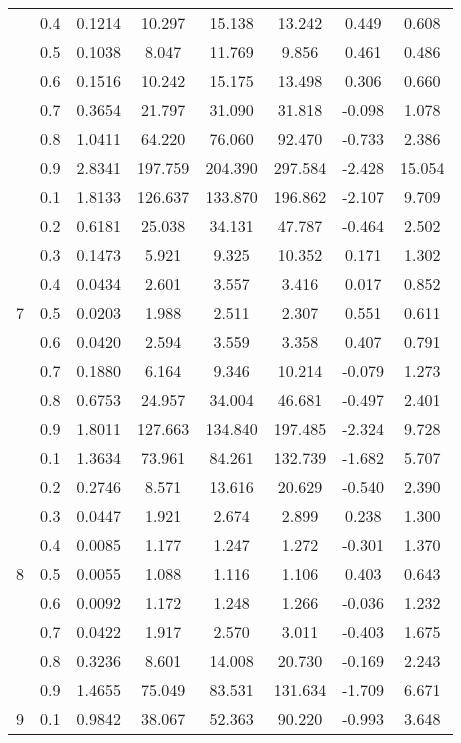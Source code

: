 \documentclass[11pt,a4paper]{report}
\begin{document}
\begin{longtable}{ | c | c || c | c | c | c | c | c | }
 & 0.4 & 0.1214 & 10.297 & 15.138 & 13.242 & 0.449 & 0.608 \\
 & 0.5 & 0.1038 & 8.047 & 11.769 & 9.856 & 0.461 & 0.486 \\
 & 0.6 & 0.1516 & 10.242 & 15.175 & 13.498 & 0.306 & 0.660 \\
 & 0.7 & 0.3654 & 21.797 & 31.090 & 31.818 & -0.098 & 1.078 \\
 & 0.8 & 1.0411 & 64.220 & 76.060 & 92.470 & -0.733 & 2.386 \\
 & 0.9 & 2.8341 & 197.759 & 204.390 & 297.584 & -2.428 & 15.054 \\
 \hline
\multirow{9}{*}{7} & 0.1 & 1.8133 & 126.637 & 133.870 & 196.862 & -2.107 & 9.709 \\
 & 0.2 & 0.6181 & 25.038 & 34.131 & 47.787 & -0.464 & 2.502 \\
 & 0.3 & 0.1473 & 5.921 & 9.325 & 10.352 & 0.171 & 1.302 \\
 & 0.4 & 0.0434 & 2.601 & 3.557 & 3.416 & 0.017 & 0.852 \\
 & 0.5 & 0.0203 & 1.988 & 2.511 & 2.307 & 0.551 & 0.611 \\
 & 0.6 & 0.0420 & 2.594 & 3.559 & 3.358 & 0.407 & 0.791 \\
 & 0.7 & 0.1880 & 6.164 & 9.346 & 10.214 & -0.079 & 1.273 \\
 & 0.8 & 0.6753 & 24.957 & 34.004 & 46.681 & -0.497 & 2.401 \\
 & 0.9 & 1.8011 & 127.663 & 134.840 & 197.485 & -2.324 & 9.728 \\
 \hline
\multirow{9}{*}{8} & 0.1 & 1.3634 & 73.961 & 84.261 & 132.739 & -1.682 & 5.707 \\
 & 0.2 & 0.2746 & 8.571 & 13.616 & 20.629 & -0.540 & 2.390 \\
 & 0.3 & 0.0447 & 1.921 & 2.674 & 2.899 & 0.238 & 1.300 \\
 & 0.4 & 0.0085 & 1.177 & 1.247 & 1.272 & -0.301 & 1.370 \\
 & 0.5 & 0.0055 & 1.088 & 1.116 & 1.106 & 0.403 & 0.643 \\
 & 0.6 & 0.0092 & 1.172 & 1.248 & 1.266 & -0.036 & 1.232 \\
 & 0.7 & 0.0422 & 1.917 & 2.570 & 3.011 & -0.403 & 1.675 \\
 & 0.8 & 0.3236 & 8.601 & 14.008 & 20.730 & -0.169 & 2.243 \\
 & 0.9 & 1.4655 & 75.049 & 83.531 & 131.634 & -1.709 & 6.671 \\
 \hline
\multirow{9}{*}{9} & 0.1 & 0.9842 & 38.067 & 52.363 & 90.220 & -0.993 & 3.648 \\

\end{longtable}
\end{document}
